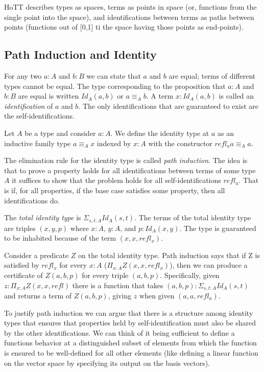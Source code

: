 \documentclass{article}
\begin{document}
HoTT describes types as spaces, terms as points in space (or, functions from the single point into the space), and identifications between terms as paths between points (functions out of [0,1] ti the space having those points as end-points).

\subsection{Path Induction and Identity}

For any two $a : A$ and $b : B$ we can state that $a$ and $b$ are equal; terms of different types cannot be equal. The type corresponding to the proposition that $a : A$ and $b : B$ are equal is written $Id_{A}(a, b)$ or $a \equiv_{A} b$. A term $x : Id_{A}(a, b)$ is called an \emph{identification} of $a$ and $b$. The only identifications that are guaranteed to exist are the self-identifications.

\begin{definition}\label{dfn: identity-type}
  Let $A$ be a type and consider $a : A$. We define the identity type at $a$ as an inductive family type $a \equiv_{A} x$ indexed by $x : A$ with the constructor $refl_{a} a \equiv_{A} a$.
\end{definition}

The elimination rule for the identity type is called \emph{path induction}. The idea is that to prove a property holds for all identifications between terms of some type $A$ it suffices to show that the problem holds for all self-identifications $refl_{a}$. That is if, for all properties, if the base case satisfies some property, then all identifications do.

The \emph{total identity type} is $\Sigma_{s, t : A} Id_{A}(s, t)$. The terms of the total identity type are triples $(x, y, p)$ where $x : A$, $y : A$, and $p : Id_{A}(x, y)$. The type is guaranteed to be inhabited because of the term $(x, x, refl_{x})$.

Consider a predicate $Z$ on the total identity type. Path induction says that if Z is satisfied by $refl_{x}$ for every $x : A$ ($\Pi_{x : A} Z(x,x,refl_{x})$), then we can produce a certificate of $Z(a, b, p)$ for every triple $(a, b, p)$. Specifically, given $z : \Pi_{x : A} Z(x, x, refl)$ there is a function that takes $(a, b, p) : \Sigma_{s, t : A} Id_{A}(s, t)$ and returns a term of $Z(a, b, p)$, giving $z$ when given $(a, a, refl_{a})$.

To justify path induction we can argue that there is a structure among identity types that ensures that properties held by self-identification must also be shared by the other identifications. We can think of it being sufficient to define a functions behavior at a distinguished subset of elements from which the function is ensured to be well-defined for all other elements (like defining a linear function on the vector space by specifying its output on the basis vectors).
\end{document}
